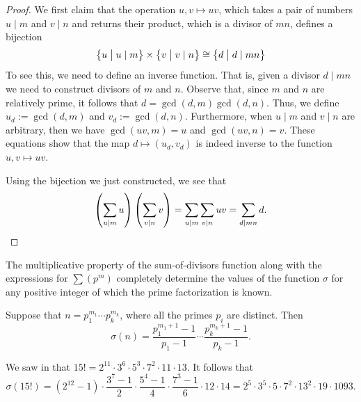 \begin{proof}
  We first claim that the operation $u,v\mapsto uv$, which takes a pair of numbers $u\mid m$ and $v\mid n$ and returns their product, which is a divisor of $mn$, defines a bijection
  \begin{equation*}
    \big\{u\bigm\vert u\mid m\big\}\times\big\{v\bigm\vert v\mid n\big\}\cong
    \big\{d \bigm\vert d\mid mn\big\}
  \end{equation*}
  To see this, we need to define an inverse function. That is, given a divisor $d\mid mn$ we need to construct divisors of $m$ and $n$. Observe that, since $m$ and $n$ are relatively prime, it follows that $d=\gcd(d,m)\gcd(d,n)$. Thus, we define $u_d:=\gcd(d,m)$ and $v_d:=\gcd(d,n)$. Furthermore, when $u\mid m$ and $v\mid n$ are arbitrary, then we have $\gcd(uv,m)=u$ and $\gcd(uv,n)=v$. These equations show that the map $d\mapsto (u_d,v_d)$ is indeed inverse to the function $u,v\mapsto uv$.

  Using the bijection we just constructed, we see that
  \begin{equation*}
    \left(\sum_{u\mid m}u\right)\left(\sum_{v\mid n}v\right)=\sum_{u\mid m}\sum_{v\mid n} uv = \sum_{d\mid mn} d.\qedhere
  \end{equation*}
\end{proof}

The multiplicative property of the sum-of-divisors function along with the expressions for $\sum(p^m)$ completely determine the values of the function $\sigma$ for any positive integer of which the prime factorization is known.

\begin{corollary}
  Suppose that $n=p_1^{m_1}\cdots p_k^{m_k}$, where all the primes $p_i$ are distinct. Then
  \begin{equation*}
    \sigma(n)=\frac{p_1^{m_1+1}-1}{p_1-1}\cdots \frac{p_k^{m_k+1}-1}{p_k-1}.
  \end{equation*}
\end{corollary}

\begin{example}
  We saw in  that $15!=2^{11}\cdot 3^6\cdot 5^3\cdot 7^2 \cdot 11\cdot 13$. It follows that
  \begin{equation*}
    \sigma(15!)=(2^{12}-1)\cdot \frac{3^7-1}{2}\cdot \frac{5^4-1}{4}\cdot \frac{7^3-1}{6}\cdot 12\cdot 14=2^5\cdot 3^5\cdot 5\cdot 7^2 \cdot 13^2\cdot 19\cdot 1093.
  \end{equation*}
\end{example}

